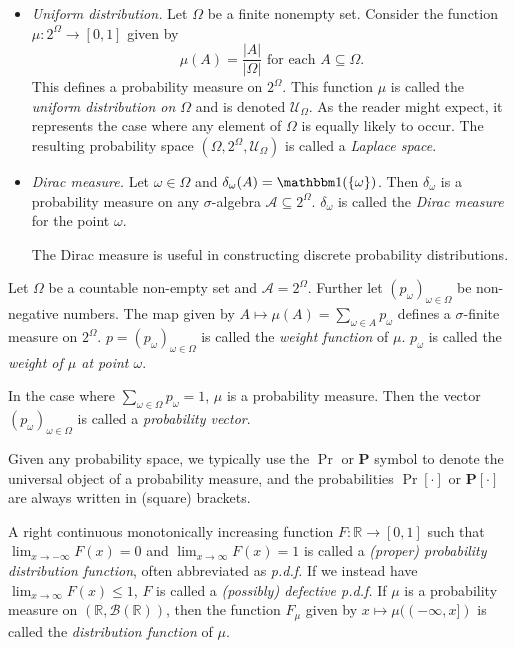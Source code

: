 \begin{itemize}
    \item \textit{Uniform distribution.} Let $\Omega$ be a finite nonempty set. Consider the function $\mu:2^\Omega\to[0,1]$ given by
    $$\mu(A)=\frac{|A|}{|\Omega|}\text{ for each $A\subseteq\Omega$.}$$
    This defines a probability measure on $2^\Omega$. This function $\mu$ is called the \textit{uniform distribution on $\Omega$} and is denoted $\mathcal{U}_\Omega$. As the reader might expect, it represents the case where any element of $\Omega$ is equally likely to occur. The resulting probability space $(\Omega,2^\Omega,\mathcal{U}_\Omega)$ is called a \textit{Laplace space}.
    
    \item \textit{Dirac measure.} Let $\omega\in\Omega$ and $\delta_\omega(A)=\indic(\{\omega\})$. Then $\delta_\omega$ is a probability measure on any $\sigma$-algebra $\mathcal{A}\subseteq2^\Omega$. $\delta_\omega$ is called the \textit{Dirac measure} for the point $\omega$.
    
    The Dirac measure is useful in constructing discrete probability distributions.
    
\end{itemize}


\vspace{2mm}
Let $\Omega$ be a countable non-empty set and $\mathcal{A}=2^\Omega$. Further let $(p_\omega)_{\omega\in\Omega}$ be non-negative numbers. The map given by $A\mapsto\mu(A)=\sum_{\omega\in A}p_\omega$ defines a $\sigma$-finite measure on $2^\Omega$. $p=(p_\omega)_{\omega\in\Omega}$ is called the \textit{weight function} of $\mu$. $p_\omega$ is called the \textit{weight of $\mu$ at point $\omega$}.

In the case where $\sum_{\omega\in\Omega}p_\omega=1$, $\mu$ is a probability measure. Then the vector $(p_\omega)_{\omega\in\Omega}$ is called a \textit{probability vector}.

\vspace{2mm}
Given any probability space, we typically use the $\Pr$ or $\textbf{P}$ symbol to denote the universal object of a probability measure, and the probabilities $\Pr[\cdot]$ or $\textbf{P}[\cdot]$ are always written in (square) brackets.

\begin{definition}
    A right continuous monotonically increasing function $F:\mathbb{R}\to[0,1]$ such that $\lim_{x\to-\infty}F(x)=0$ and $\lim_{x\to\infty}F(x)=1$ is called a \textit{(proper) probability distribution function}, often abbreviated as \textit{p.d.f.} If we instead have $\lim_{x\to\infty}F(x)\leq 1$, $F$ is called a \textit{(possibly) defective p.d.f.} If $\mu$ is a probability measure on $(\mathbb{R},\mathcal{B}(\mathbb{R}))$, then the function $F_\mu$ given by $x\mapsto \mu((-\infty,x])$ is called the \textit{distribution function} of $\mu$.
\end{definition}

